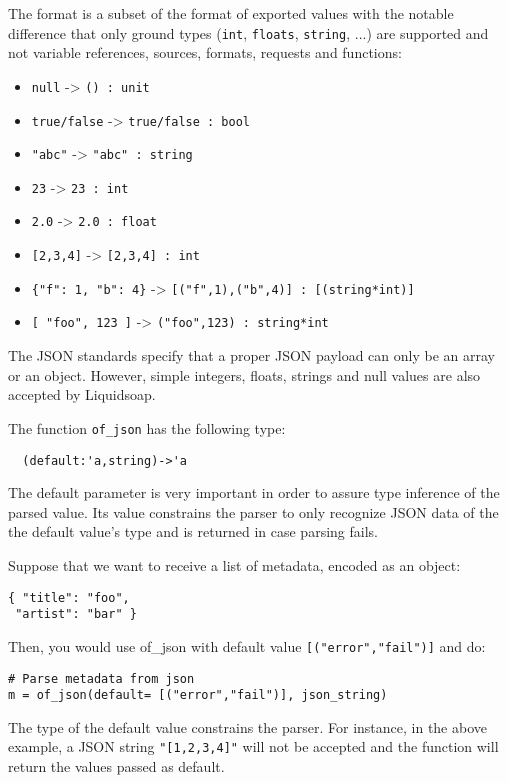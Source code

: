 The format is a subset of the format of exported values with the notable
difference that only ground types (\verb+int+, \verb+floats+, \verb+string+, ...)
are supported and not variable references, sources, formats,
requests and functions:

\begin{itemize}
\item \verb+null+ -> \verb+() : unit+
\item \verb+true/false+ -> \verb+true/false : bool+
\item \verb+"abc"+ -> \verb+"abc" : string+
\item \verb+23+ -> \verb+23 : int+
\item \verb+2.0+ -> \verb+2.0 : float+
\item \verb+[2,3,4]+ -> \verb+[2,3,4] : int+
\item \verb+{"f": 1, "b": 4}+ -> \verb+[("f",1),("b",4)] : [(string*int)]+
\item \verb+[ "foo", 123 ]+ -> \verb+("foo",123) : string*int+

\end{itemize}
The JSON standards specify that a proper JSON payload can only be an array or an
object. However, simple integers, floats, strings and null values are
also accepted by Liquidsoap.

The function \verb+of_json+ has the following type:

\begin{verbatim}
  (default:'a,string)->'a
\end{verbatim}
The default parameter is very important in order to assure 
type inference of the parsed value. Its value constrains
the parser to only recognize JSON data of the the default value's 
type and is returned in case parsing fails.

Suppose that we want to receive a list of metadata, encoded as an object:

\begin{verbatim}
{ "title": "foo",
 "artist": "bar" }
\end{verbatim}
Then, you would use of\_json with default value \verb+[("error","fail")]+ and do:

\begin{verbatim}
# Parse metadata from json
m = of_json(default= [("error","fail")], json_string)
\end{verbatim}
The type of the default value constrains the parser. For instance, in the 
above example, a JSON string \verb+"[1,2,3,4]"+ will not be accepted and the 
function will return the values passed as default.

